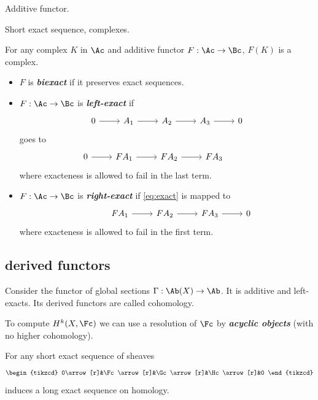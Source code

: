 \begin{defn}
	Additive functor.
\end{defn}
\begin{defn}
	Short exact sequence, complexes.
\end{defn}
\begin{remark}
	For any complex $K$ in $\Ac$ and additive functor $F:\Ac\to\Bc$, $F(K)$ is a complex.
\end{remark}
\begin{defn}
	\begin{itemize}
		\item $F$ is \textbf{\textit{biexact}} if it preserves exact sequences.
		\item $F:\Ac\to\Bc$ is \textbf{\textit{left-exact}} if 
		\begin{equation}\label{eq:exact}
			\begin{tikzcd}
			0\arrow[r]&A_1\arrow[r]&A_2\arrow[r]&A_3\arrow[r]&0
		\end{tikzcd}
		\end{equation}
		goes to
		\[\begin{tikzcd}
			0\arrow[r]&FA_1\arrow[r]&FA_2\arrow[r]&FA_3\arrow[r,phantom]& \leavevmode
		\end{tikzcd}\]
		where exacteness is allowed to fail in the last term.
		\item $F:\Ac\to\Bc$ is \textbf{\textit{right-exact}} if \cref{eq:exact} is mapped to
		\[\begin{tikzcd}
			\leavevmode\arrow[r,phantom]&FA_1\arrow[r]&FA_2\arrow[r]&FA_3\arrow[r]& 0
		\end{tikzcd}\]
		where exacteness is allowed to fail in the first term.
	\end{itemize}
\end{defn}

\subsection{derived functors}
Consider the functor of global sections $\Gamma:\Ab(X)\to\Ab$. It is additive and left-exacts. Its derived functors are called cohomology.

To compute $H^k(X,\Fc)$ we can use a resolution of $\Fc$ by \textbf{\textit{acyclic objects}} (with no higher cohomology).

\begin{claim}
	For any short exact sequence of sheaves
	\[\begin{tikzcd}
		0\arrow[r]&\Fc\arrow[r]&\Gc\arrow[r]&\Hc\arrow[r]&0
	\end{tikzcd}\]
	induces a long exact sequence on homology.
\end{claim}

